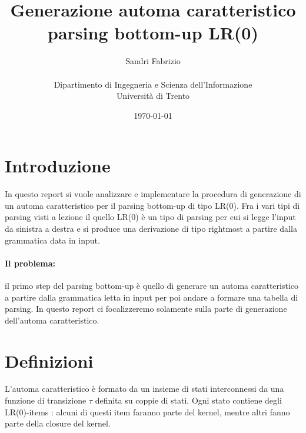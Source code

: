 \documentclass[12pt]{article}
\title{Generazione automa caratteristico parsing bottom-up LR(0) }
\author{
        Sandri Fabrizio \\ \\        
        Dipartimento di Ingegneria e Scienza dell'Informazione\\
        Università di Trento
}
\date{\today}
\begin{document}
\maketitle

\section{Introduzione}
In questo report si vuole analizzare e implementare la procedura di generazione di un automa caratteristico per il parsing bottom-up di tipo LR(0). Fra i vari tipi di parsing visti a lezione il quello LR(0) è un tipo di parsing per cui si legge l'input da sinistra a destra e si produce una derivazione di tipo rightmost a partire dalla grammatica data in input.

\paragraph{Il problema:} 
il primo step del parsing bottom-up è quello di generare un automa caratteristico a partire dalla grammatica letta in input per poi andare a formare una tabella di parsing. In questo report ci focalizzeremo solamente sulla parte di generazione dell'automa caratteristico.

\section{Definizioni}
L'automa caratteristico è formato da un insieme di stati interconnessi da una funzione di transizione $\tau$ definita su coppie di stati. 
Ogni stato contiene degli LR(0)-items : alcuni di questi item faranno parte del kernel, mentre altri fanno parte della closure del kernel.\\
\end{document}
